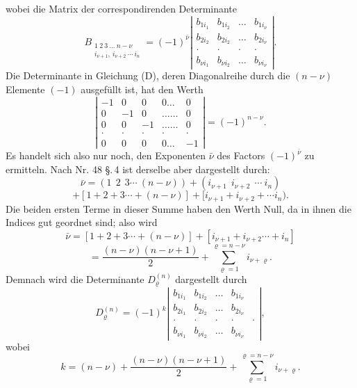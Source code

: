 \documentclass[11pt]{article}
\providecommand{\weberpage}[1]{}
\begin{document}
\weberpage{84}

wobei die Matrix der correspondirenden Determinante
\[
B_{\substack{1\ 2\ 3\ \ldots\ n-\nu\\i_{\nu+1},\ i_{\nu+2}\ \cdots\ i_n}}
=(-1)^{\bar\nu}
\left|\begin{array}{cccc}
b_{1i_1} & b_{1i_2} & \ldots & b_{1i_\nu}\\
b_{2i_2} & b_{2i_2} & \ldots & b_{2i_\nu}\\
\cdot & \cdot & \cdot & \cdot\\
b_{\nu i_1} & b_{\nu i_2} & \ldots & b_{\nu i_\nu}
\end{array}\right|.
\]
Die Determinante in Gleichung (D), deren Diagonalreihe durch die $(n-\nu)$
Elemente $(-1)$ ausgef\"ullt ist, hat den Werth
\[
\left|\begin{array}{ccccc}
-1 & 0 & 0 & 0\ldots & 0\\
0 & -1 & 0 & \ldots\ldots & 0\\
0 & 0 & -1 & \ldots\ldots & 0\\
\cdot & \cdot & \cdot & \cdot & \cdot\\
0 & 0 & 0 & 0\ldots & -1
\end{array}\right|
=(-1)^{n-\nu}.
\]
Es handelt sich also nur noch, den Exponenten $\bar\nu$ des Factors
$(-1)^{\bar\nu}$ zu ermitteln. Nach Nr. 48 \S.\,4 ist derselbe aber dargestellt
durch:
\[
\bar\nu=(1\ \ 2\ \ 3\cdots\ (n-\nu))+(i_{\nu+1}\ \ i_{\nu+2}\ \ \cdots\ i_n)
\]
\[
+[1+2+3\cdots+(n-\nu)]+[i_{\nu+1}+i_{\nu+2}+\cdots i_n). %
\]
Die beiden ersten Terme in dieser Summe haben den Werth Null, da in ihnen
die Indices gut geordnet sind; also wird
\[
\bar\nu=[1+2+3\cdots+(n-\nu)]+[i_{\nu+1}+i_{\nu+2}\cdots+i_n]
\]
\[
=\frac{(n-\nu)(n-\nu+1)}{2}+\sum_{\varrho=1}^{\varrho=n-\nu}i_{\nu+\varrho}.
\]
Demnach wird die Determinante $D_\varrho^{(n)}$ dargestellt durch
\[
D_\varrho^{(n)}=(-1)^k
\left|\begin{array}{ccccc}
b_{1i_1} & b_{1i_2} & \ldots & b_{1i_\nu}\\
b_{2i_1} & b_{2i_2} & \ldots & b_{2i_\nu}\\
\cdot & \cdot & \cdot & \cdot & \cdot\\
b_{\nu i_1} & b_{\nu i_2} & \ldots & b_{\nu i_\nu}
\end{array}\right|,
\]
wobei
\[
k=(n-\nu)+\frac{(n-\nu)(n-\nu+1)}{2}+\sum_{\varrho=1}^{\varrho=n-\nu}i_{\nu+\varrho}. \tag{E}
\]
\end{document}
